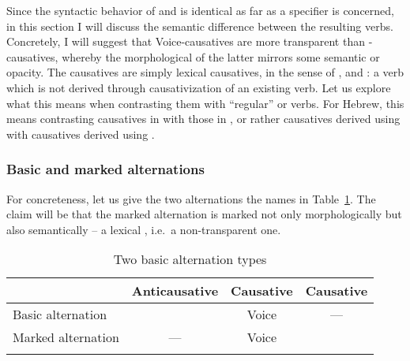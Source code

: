 \begin{exe}
\begin{xlist}
\begin{xlist}
\begin{exe}
\begin{exe}
\begin{xlist}
\begin{exe}
\begin{xlist}
\begin{exe}
\begin{xlist}
\begin{xlist}
\begin{exe}
\begin{xlist}
\begin{exe}
\begin{xlist}
\begin{exe}
\begin{xlist}
\begin{exe}
\begin{exe}
\begin{exe}
\begin{xlist}
\begin{exe}
\begin{exe}
\begin{xlist}
\begin{xlist}
\begin{exe}
\begin{xlist}
\begin{exe}
\begin{exe}
\begin{xlist}
\begin{exe}
\begin{exe}
\begin{xlist}
\begin{exe}
\begin{xlist}
\begin{exe}
\begin{xlist}
\begin{exe}
\begin{xlist}
\begin{exe}
Since the syntactic behavior of  and {\vd} is identical as far as  a specifier is concerned, in this section I will discuss the semantic difference between the resulting  verbs. Concretely, I will suggest that Voice-causatives are more transparent than {\vd}-causatives, whereby the morphological  of the latter mirrors some semantic  or opacity. The {\vd} causatives are simply lexical causatives, in the sense of \cite{fodor70}, \cite{miyagawa98} and \cite{harley08}: a  verb which is not derived through causativization of an existing verb. Let us explore what this means when contrasting them with ``regular''  or  verbs. For Hebrew, this means contrasting causatives in {\tkal} with those in {\thif}, or rather causatives derived using  with causatives derived using {\vd}.

		\subsubsection{Basic and marked alternations}
For concreteness, let us give the two alternations the names in Table~\ref{tab:4-4:alt}. The claim will be that the marked alternation is marked not only morphologically but also semantically -- a lexical , i.e.~a non-transparent one.

 \begin{table}
\begin{tabular}{lccc}
 \lsptoprule
	&	Anticausative & Causative & Causative\\\midrule
Basic alternation	& {\vz} & Voice & ---  \\
Marked alternation		&	---	&  Voice & {\vd}\\
\lspbottomrule
 \end{tabular}
 	\caption{Two basic alternation types\label{tab:4-4:alt}}
\end{table}


\end{exe}
\end{xlist}
\end{exe}
\end{xlist}
\end{exe}
\end{xlist}
\end{exe}
\end{xlist}
\end{exe}
\end{exe}
\end{xlist}
\end{exe}
\end{exe}
\end{xlist}
\end{exe}
\end{xlist}
\end{xlist}
\end{exe}
\end{exe}
\end{xlist}
\end{exe}
\end{exe}
\end{exe}
\end{xlist}
\end{exe}
\end{xlist}
\end{exe}
\end{xlist}
\end{exe}
\end{xlist}
\end{xlist}
\end{exe}
\end{xlist}
\end{exe}
\end{xlist}
\end{exe}
\end{exe}
\end{xlist}
\end{xlist}
\end{exe}
